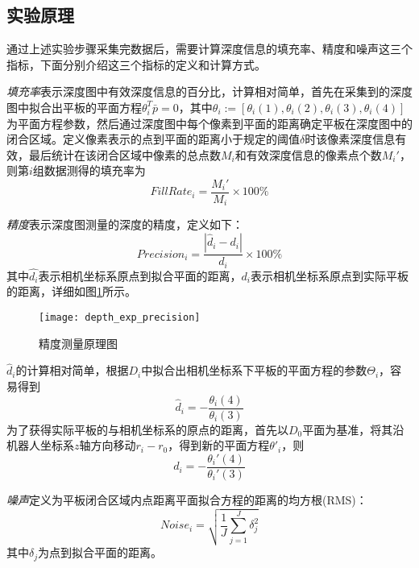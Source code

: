 \subsection{实验原理}
通过上述实验步骤采集完数据后，需要计算深度信息的填充率、精度和噪声这三个指标，下面分别介绍这三个指标的定义和计算方式。

\emph{填充率}表示深度图中有效深度信息的百分比，计算相对简单，首先在采集到的深度图中拟合出平板的平面方程$\theta_i^T\bar{p}=0$，其中$\theta_i := [\theta_i(1), \theta_i(2), \theta_i(3), \theta_i(4)]$为平面方程参数，然后通过深度图中每个像素到平面的距离确定平板在深度图中的闭合区域。定义像素表示的点到平面的距离小于规定的阈值$\delta$时该像素深度信息有效，最后统计在该闭合区域中像素的总点数$M_i$和有效深度信息的像素点个数$M_i'$，则第$i$组数据测得的填充率为
\begin{equation}
  FillRate_i = \frac{M_i'}{M_i} \times 100\%
\end{equation}

\emph{精度}表示深度图测量的深度的精度，定义如下：
\begin{equation}
  Precision_i = \frac{|\hat{d}_i-d_i|}{d_i} \times 100\%
\end{equation}
其中$\hat{d_i}$表示相机坐标系原点到拟合平面的距离，$d_i$表示相机坐标系原点到实际平板的距离，详细如图\ref{fig:depth_exp_precision}所示。
\begin{figure}
  \centering
  \texttt{[image: depth\_exp\_precision]}
  \caption{精度测量原理图}
  \label{fig:depth_exp_precision}
\end{figure}
$\hat{d}_i$的计算相对简单，根据$D_i$中拟合出相机坐标系下平板的平面方程的参数$\Theta_i$，容易得到
\begin{equation}
  \hat{d}_i = -\frac{\theta_i(4)}{\theta_i(3)}
\end{equation}
为了获得实际平板的与相机坐标系的原点的距离，首先以$D_0$平面为基准，将其沿机器人坐标系$z$轴方向移动$r_i-r_0$，得到新的平面方程$\theta'_i$，则
\begin{equation}
  d_i = -\frac{\theta_i'(4)}{\theta_i'(3)}
\end{equation}

\emph{噪声}定义为平板闭合区域内点距离平面拟合方程的距离的均方根(RMS)：
\begin{equation}
  Noise_i = \sqrt{\frac{1}{J}\sum_{j=1}^J{\delta_j^2}}
\end{equation}
其中$\delta_j$为点到拟合平面的距离。


